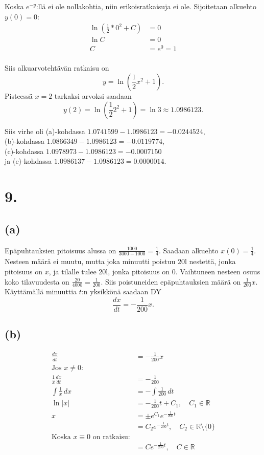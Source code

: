 \documentclass{article}
\begin{document}
Koska $e^{-y}$:llä ei ole nollakohtia, niin erikoisratkaisuja ei ole.
Sijoitetaan alkuehto $y(0) = 0$:
\begin{align*}
  \ln (\frac{1}{2}*0^2 + C) &= 0 \\
  \ln C &= 0 \\
  C &= e^0 = 1 \\
\end{align*}

Siis alkuarvotehtävän ratkaisu on
\[
  y = \ln (\frac{1}{2}x^2 + 1).
\]
Pisteessä $x = 2$ tarkaksi arvoksi saadaan
\[
  y(2) = \ln (\frac{1}{2}2^2 + 1) = \ln 3 \approx 1.0986123.
\]

Siis virhe oli (a)-kohdassa $1.0741599 - 1.0986123 = -0.0244524$,\\
(b)-kohdassa $1.0866349 - 1.0986123 = -0.0119774$,\\
(c)-kohdassa $1.0978973 - 1.0986123 = -0.0007150$\\
ja (e)-kohdassa $1.0986137 - 1.0986123 = 0.0000014$.

\section*{9.}

\subsection*{(a)}

Epäpuhtauksien pitoisuus alussa on $\frac{1000}{3000 + 1000} = \frac{1}{4}$.
Saadaan alkuehto $x(0) = \frac{1}{4}$. Nesteen määrä ei muutu, mutta joka
minuutti poistuu 20l nestettä, jonka pitoisuus on $x$, ja tilalle tulee 20l,
jonka pitoisuus on 0. Vaihtuneen nesteen osuus koko tilavuudesta on
$\frac{20}{4000} = \frac{1}{200}$. Siis poistuneiden epäpuhtauksien määrä on
$\frac{1}{200}x$. Käyttämällä minuuttia $t$:n yksikkönä saadaan DY
\[
  \frac{dx}{dt} = -\frac{1}{200}x.
\]

\subsection*{(b)}

\begin{align*}
  \frac{dx}{dt} &= -\frac{1}{200}x \\
  \text{Jos $x \neq 0$:} \\
  \frac{1}{x}\frac{dx}{dt} &= -\frac{1}{200} \\
  \int \frac{1}{x}\,dx &= -\int \frac{1}{200}\,dt \\
  \ln |x| &= -\frac{1}{200}t + C_1, \quad C_1 \in \mathbb{R} \\
  x &= \pm e^{C_1} e^{-\frac{1}{200}t} \\
    &= C_2 e^{-\frac{1}{200}t}, \quad C_2 \in \mathbb{R} \setminus \{0\} \\
  \text{Koska $x \equiv 0$ on ratkaisu:} \\
    &= Ce^{-\frac{1}{200}t}, \quad C \in \mathbb{R} \\
\end{align*}
\end{document}
